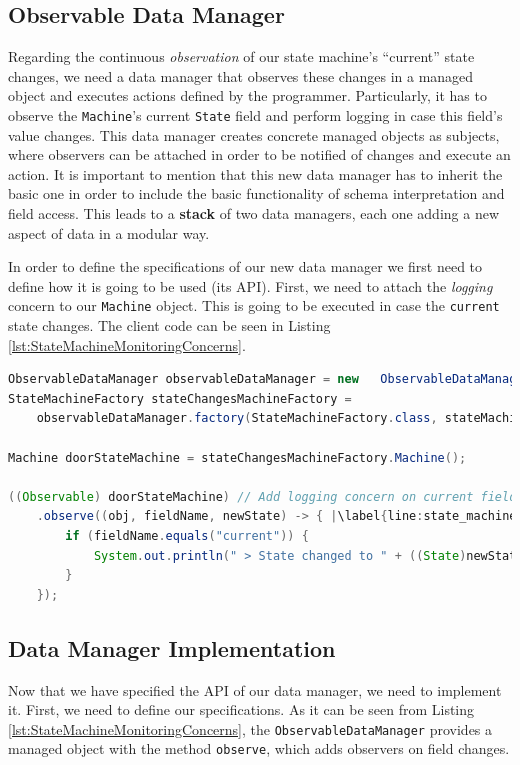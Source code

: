 \subsection{Observable Data Manager}
Regarding the continuous \textit{observation} of our state machine's ``current'' state changes, we need a data manager that observes these changes in a managed object and executes actions defined by the programmer.
Particularly, it has to observe the \texttt{Machine}'s current \texttt{State} field and perform logging in case this field's value changes.
This data manager creates concrete managed objects as subjects, where observers can be attached in order to be notified of changes and execute an action.
It is important to mention that this new data manager has to inherit the basic one in order to include the basic functionality of schema interpretation and field access.
This leads to a \textbf{stack} of two data managers, each one adding a new aspect of data in a modular way.

In order to define the specifications of our new data manager we first need to define how it is going to be used (its API).
First, we need to attach the \textit{logging} concern to our \texttt{Machine} object. 
This is going to be executed in case the \texttt{current} state changes.
The client code can be seen in Listing \ref{lst:StateMachineMonitoringConcerns}.

\begin{sourcecode} [H]
	\begin{lstlisting}[language=Java, escapechar=|]
ObservableDataManager observableDataManager = new 	ObservableDataManager();
StateMachineFactory stateChangesMachineFactory =
	observableDataManager.factory(StateMachineFactory.class, stateMachineSchema);

Machine doorStateMachine = stateChangesMachineFactory.Machine();

((Observable) doorStateMachine) // Add logging concern on current field changes
	.observe((obj, fieldName, newState) -> { |\label{line:state_machine_monitor}|
		if (fieldName.equals("current")) {
			System.out.println(" > State changed to " + ((State)newState).name());
		}
	});
	\end{lstlisting}
	\caption{Door state machine with logging concern}
	\label{lst:StateMachineMonitoringConcerns}
\end{sourcecode}

\subsection{Data Manager Implementation}
Now that we have specified the API of our data manager, we need to implement it.
First, we need to define our specifications.
As it can be seen from Listing \ref{lst:StateMachineMonitoringConcerns}, the \texttt{ObservableDataManager} provides a managed object with the method \texttt{observe}, which adds observers on field changes.


